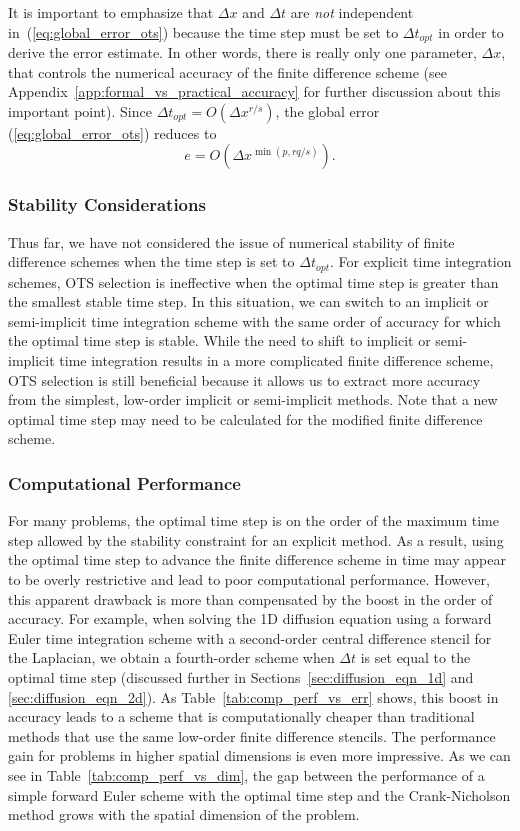 \documentclass[fleqn,12pt,twoside]{article}
\newcommand{\beq}{\begin{equation}}
\newcommand{\eeq}{\end{equation}}
\def\dt{\Delta t}
\def\dx{\Delta x}
\def\dto{\dt_{opt}}
\begin{document}
It is important to emphasize that $\dx$ and $\dt$ are \emph{not} independent 
in~(\ref{eq:global_error_ots}) because the time step must be set to $\dto$ 
in order to derive the error estimate.  In other words, there is really only 
one parameter, $\dx$, that controls the numerical accuracy of the finite 
difference scheme (see Appendix~\ref{app:formal_vs_practical_accuracy} for 
further discussion about this important point).  Since $\dto = O(\dx^{r/s})$, 
the global error (\ref{eq:global_error_ots}) reduces to
\beq
e = O \left( \dx^{\min(p,rq/s)} \right).
\label{eq:global_error_ots_simplified}
\eeq


\subsubsection*{Stability Considerations}
Thus far, we have not considered the issue of numerical stability of finite
difference schemes when the time step is set to $\dto$.  For explicit time 
integration schemes, OTS selection is ineffective when the optimal time step 
is greater than the smallest stable time step.  In this situation, we can 
switch to an implicit or semi-implicit time integration scheme with the 
same order of accuracy for which the optimal time step is stable.  
While the need to shift to implicit or semi-implicit time integration results 
in a more complicated finite difference scheme, OTS selection is still 
beneficial because it allows us to extract more accuracy from the simplest, 
low-order implicit or semi-implicit methods.
Note that a new optimal time step may need to be calculated for the modified 
finite difference scheme.


\subsubsection*{\label{sec:computational_performance} 
                Computational Performance}
For many problems, the optimal time step is on the order of the maximum 
time step allowed by the stability constraint for an explicit method.  
As a result, using the optimal time step to advance the finite
difference scheme in time may appear to be overly restrictive and lead to poor 
computational performance.  However, this apparent drawback is more than 
compensated by the boost in the order of accuracy.  For example, when solving 
the 1D diffusion equation using a forward Euler time integration scheme with a 
second-order central difference stencil for the Laplacian, we obtain a 
fourth-order scheme when $\dt$ is set equal to the optimal time step 
(discussed further in Sections~\ref{sec:diffusion_eqn_1d} and
\ref{sec:diffusion_eqn_2d}).  
As Table~\ref{tab:comp_perf_vs_err} shows, this boost in accuracy leads to a
scheme that is computationally cheaper than traditional methods that use 
the same low-order finite difference stencils.  The performance gain for 
problems in higher spatial dimensions is even more impressive.  As we can see 
in Table~\ref{tab:comp_perf_vs_dim}, the gap between the performance of a
simple forward Euler scheme with the optimal time step and the Crank-Nicholson
method grows with the spatial dimension of the problem.  
\end{document}
